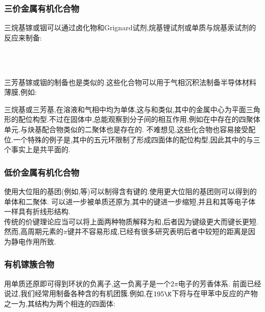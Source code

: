 \documentclass{ctexart}
\begin{document}
\subsubsection{三价金属有机化合物}
三烷基镓或铟可以通过卤化物和Grignard试剂,烷基锂试剂或单质与烷基汞试剂的反应来制备:
\begin{center}
    \\
    \\
\end{center}
三芳基镓或铟的制备也是类似的.这些化合物可以用于气相沉积法制备半导体材料薄膜,例如:
\begin{center}
\end{center}
三烷基或三芳基,在溶液和气相中均为单体,这与和类似,其中的金属中心为平面三角形的配位构型.不过在固体中,总能观察到分子间的相互作用,例如在中存在的四聚体单元.与炔基配合物类似的二聚体也是存在的.
不难想见,这些化合物也容易接受配位.一个特殊的例子是,其中的五元环限制了形成四面体的配位构型,因此其中的与三个事实上是共平面的.
\subsubsection{低价金属有机化合物}
使用大位阻的基团(例如,等)可以制得含有键的.使用更大位阻的基团则可以得到的单体和二聚体.
可以进一步被单质还原为,其中的键进一步缩短,并且和其等电子体一样具有折线形结构.\\
\indent 传统的价键理论应当可以将上面两种物质解释为和,后者因为键级更大而键长更短.然而,高周期元素的$\pi$键并不容易形成,已经有很多研究表明后者中较短的距离是因为静电作用所致.
\subsubsection{有机镓簇合物}
\indent 用单质还原即可得到环状的负离子,这一负离子是一个$2\pi$电子的芳香体系.
前面已经说过,我们经常用制备各种含的有机团簇.例如,在$195\K$下将与在甲苯中反应的产物之一为,其结构为两个相连的四面体:
\end{document}
